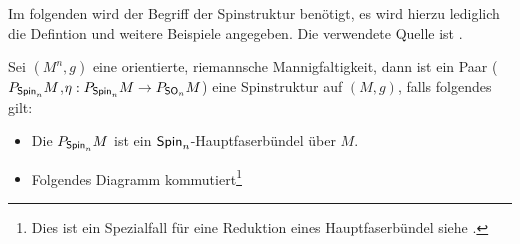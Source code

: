 Im folgenden wird der Begriff der Spinstruktur benötigt, es wird
hierzu lediglich die Defintion und weitere Beispiele angegeben.  Die
verwendete Quelle ist \cite{BHMMM15}.   
\begin{Def}[Spinstruktur]\label{DefSpin}
  Sei $(M^n,g)$ eine orientierte, riemannsche Mannigfaltigkeit, dann ist ein Paar
  ($P_{\operatorname{\mathsf{Spin}}_n}M$,$\eta : P_{\operatorname{\mathsf{Spin}}_n}M \rightarrow
  P_{\operatorname{\mathsf{SO}}_n}M$) eine Spinstruktur auf $(M,g)$, falls folgendes gilt:
	 \begin{itemize}
         \item Die \mfg $P_{\operatorname{\mathsf{Spin}}_n}M$ ist ein
           $\operatorname{\mathsf{Spin}}_n$-Hauptfaserbündel über $ M $.
         \item Folgendes Diagramm kommutiert\footnote{Dies ist ein Spezialfall für eine Reduktion eines Hauptfaserbündel siehe \cite[Seite 63]{baum09}.}\\

           \begin{center}
           \end{center}


\end{itemize}
\end{Def}
